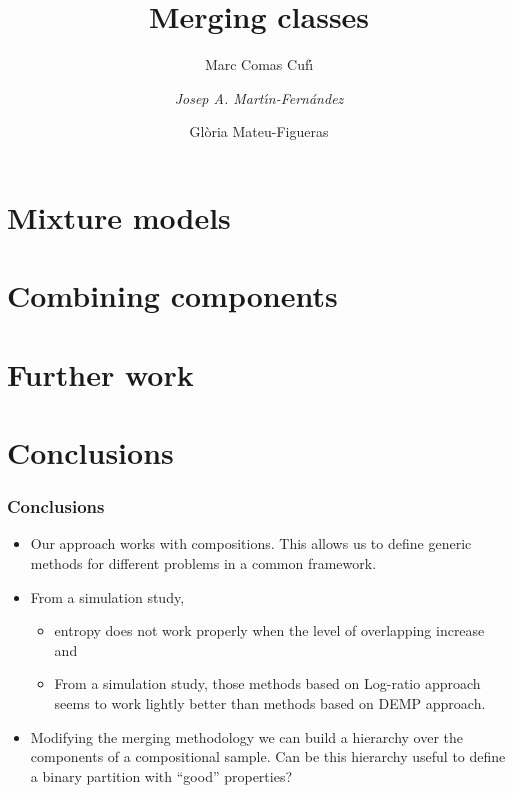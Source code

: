 \documentclass[10pt]{beamer}
\title{Merging classes}
\author{Marc Comas Cuf\'{\i} \\ \and \emph{Josep A. Mart\'{\i}n-Fern\'{a}ndez} \\ \and Gl\`{o}ria Mateu-Figueras}
\date{}
\begin{document}
\begin{frame}
\titlepage
\end{frame}

\section{Mixture models}
\frame{\sectionpage}



\section{Combining components}
\frame{\sectionpage}





\section{Further work}
\frame{\sectionpage}



\section{Conclusions}
\begin{frame}
\frametitle{Conclusions}
\begin{itemize}
\item Our approach works with compositions. This allows us to define generic methods for different problems in a common framework.
\item From a simulation study, 
\begin{itemize}
\item entropy does not work properly when the level of overlapping increase and
\item From a simulation study, those methods based on Log-ratio approach seems to work lightly better than methods based on DEMP approach.
\end{itemize}
\item Modifying the merging methodology we can build a hierarchy over the components of a compositional sample. Can be this hierarchy useful to define a binary partition with ``good'' properties? 
\end{itemize}

\end{frame}

%
\end{document}
